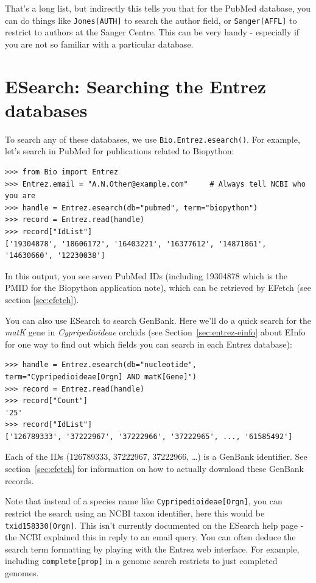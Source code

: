 \documentclass{report}
\begin{document}
That's a long list, but indirectly this tells you that for the PubMed
database, you can do things like \texttt{Jones[AUTH]} to search the
author field, or \texttt{Sanger[AFFL]} to restrict to authors at the
Sanger Centre. This can be very handy - especially if you are not so
familiar with a particular database.

\section{ESearch: Searching the Entrez databases}
\label{sec:entrez-esearch}
To search any of these databases, we use \verb+Bio.Entrez.esearch()+. For example, let's search in PubMed for publications related to Biopython:
\begin{verbatim}
>>> from Bio import Entrez
>>> Entrez.email = "A.N.Other@example.com"     # Always tell NCBI who you are
>>> handle = Entrez.esearch(db="pubmed", term="biopython")
>>> record = Entrez.read(handle)
>>> record["IdList"]
['19304878', '18606172', '16403221', '16377612', '14871861', '14630660', '12230038']
\end{verbatim}
In this output, you see seven PubMed IDs (including 19304878 which is the PMID for the Biopython application note), which can be retrieved by EFetch (see section \ref{sec:efetch}).

You can also use ESearch to search GenBank. Here we'll do a quick
search for the \emph{matK} gene in \emph{Cypripedioideae} orchids
(see Section~\ref{sec:entrez-einfo} about EInfo for one way to
find out which fields you can search in each Entrez database):

\begin{verbatim}
>>> handle = Entrez.esearch(db="nucleotide", term="Cypripedioideae[Orgn] AND matK[Gene]")
>>> record = Entrez.read(handle)
>>> record["Count"]
'25'
>>> record["IdList"]
['126789333', '37222967', '37222966', '37222965', ..., '61585492']
\end{verbatim}

\noindent Each of the IDs (126789333, 37222967, 37222966, \ldots) is a GenBank identifier.
See section~\ref{sec:efetch} for information on how to actually download these GenBank records.

Note that instead of a species name like \texttt{Cypripedioideae[Orgn]}, you can restrict the search using an NCBI taxon identifier, here this would be \texttt{txid158330[Orgn]}.  This isn't currently documented on the ESearch help page - the NCBI explained this in reply to an email query.  You can often deduce the search term formatting by playing with the Entrez web interface.  For example, including \texttt{complete[prop]} in a genome search restricts to just completed genomes.
\end{document}
